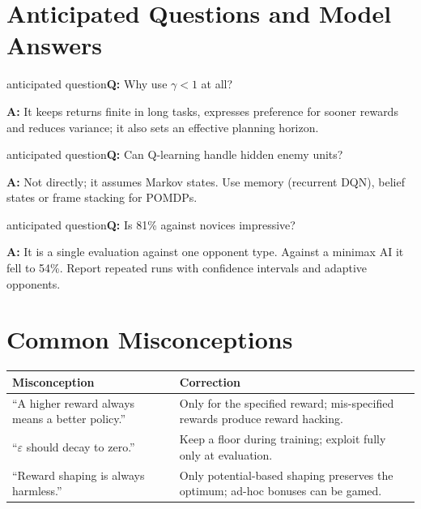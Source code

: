\documentclass[11pt]{article}
\begin{document}
\section{Anticipated Questions and Model Answers}

\begin{question}{anticipated question}\textbf{Q:} Why use $\gamma<1$ at all?\par\smallskip\textbf{A:} It keeps returns finite in long tasks, expresses preference for sooner rewards and reduces variance; it also sets an effective planning horizon.\end{question}

\begin{question}{anticipated question}\textbf{Q:} Can Q-learning handle hidden enemy units?\par\smallskip\textbf{A:} Not directly; it assumes Markov states. Use memory (recurrent DQN), belief states or frame stacking for POMDPs.\end{question}

\begin{question}{anticipated question}\textbf{Q:} Is 81\% against novices impressive?\par\smallskip\textbf{A:} It is a single evaluation against one opponent type. Against a minimax AI it fell to 54\%. Report repeated runs with confidence intervals and adaptive opponents.\end{question}

\section{Common Misconceptions}\begin{center}\small\renewcommand{\arraystretch}{1.35}\begin{tabularx}{\textwidth}{@{}>{\raggedright\arraybackslash}X >{\raggedright\arraybackslash}X@{}}\toprule\textbf{Misconception} & \textbf{Correction}\\\midrule``A higher reward always means a better policy.'' & Only for the specified reward; mis-specified rewards produce reward hacking.\\
``$\varepsilon$ should decay to zero.'' & Keep a floor during training; exploit fully only at evaluation.\\
``Reward shaping is always harmless.'' & Only potential-based shaping preserves the optimum; ad-hoc bonuses can be gamed.\\\bottomrule\end{tabularx}\end{center}
\end{document}
